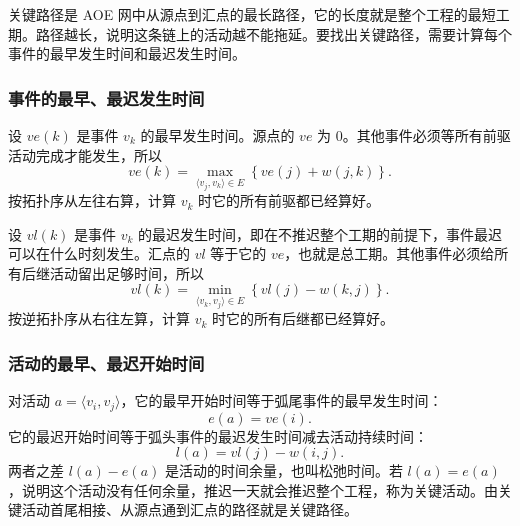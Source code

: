 关键路径是 AOE 网中从源点到汇点的最长路径，它的长度就是整个工程的最短工期。路径越长，说明这条链上的活动越不能拖延。要找出关键路径，需要计算每个事件的最早发生时间和最迟发生时间。

\subsubsection{事件的最早、最迟发生时间}

设 $ve(k)$ 是事件 $v_k$ 的最早发生时间。源点的 $ve$ 为 0。其他事件必须等所有前驱活动完成才能发生，所以
\[
ve(k)=\max_{\langle v_j,v_k\rangle\in E}\left\{ve(j)+w(j,k)\right\}.
\]
按拓扑序从左往右算，计算 $v_k$ 时它的所有前驱都已经算好。

设 $vl(k)$ 是事件 $v_k$ 的最迟发生时间，即在不推迟整个工期的前提下，事件最迟可以在什么时刻发生。汇点的 $vl$ 等于它的 $ve$，也就是总工期。其他事件必须给所有后继活动留出足够时间，所以
\[
vl(k)=\min_{\langle v_k,v_j\rangle\in E}\left\{vl(j)-w(k,j)\right\}.
\]
按逆拓扑序从右往左算，计算 $v_k$ 时它的所有后继都已经算好。

\subsubsection{活动的最早、最迟开始时间}

对活动 $a=\langle v_i,v_j\rangle$，它的最早开始时间等于弧尾事件的最早发生时间：
\[
e(a)=ve(i).
\]
它的最迟开始时间等于弧头事件的最迟发生时间减去活动持续时间：
\[
l(a)=vl(j)-w(i,j).
\]
两者之差 $l(a)-e(a)$ 是活动的时间余量，也叫松弛时间。若 $l(a)=e(a)$，说明这个活动没有任何余量，推迟一天就会推迟整个工程，称为关键活动。由关键活动首尾相接、从源点通到汇点的路径就是关键路径。

